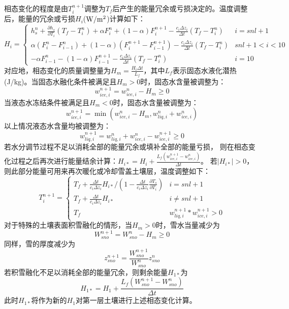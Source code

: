 相态变化的程度是由$T_i^{n+1}$调整为$T_f$后产生的能量冗余或亏损决定的。温度调整后，能量的冗余或亏损$H_i$($\rm W/m^2$)计算如下：
\begin{equation}
H_{i}=\left\{\begin{array}{lr}h_{s}^{n}+\frac{\partial h_{s}}{\partial T_{i}}\left(T_{f}-T_{i}^{n}\right)+\alpha F_{i}^{n}+(1-\alpha) F_{i}^{n+1}-\frac{c_{i} \Delta z_{i}}{\Delta t}\left(T_{f}-T_{i}^{n}\right) & i=s n l+1 \\ \alpha\left(F_{i}^{n}-F_{i-1}^{n}\right)+(1-\alpha)\left(F_{i}^{n+1}-F_{i-1}^{n+1}\right)-\frac{c_{i} \Delta z_{i}}{\Delta t}\left(T_{f}-T_{i}^{n}\right) & s n l+1<i<10 \\ -\alpha F_{i-1}^{n}-(1-\alpha) F_{i-1}^{n+1}-\frac{c_{i} \Delta z_{i}}{\Delta t}\left(T_{f}-T_{i}^{n}\right) & i=10\end{array}\right.
\end{equation}
对应地，相态变化的质量调整量为$H_{m}=\frac{H_{i} \Delta t}{L_{f}}$，其中$L_f$表示固态水液化潜热(J/kg)。当固态水融化条件被满足且$H_m>0$时，固态水含量被调整为：
\begin{equation}
w_{ice, i}^{n+1}=w_{ice, i}^{n}-H_{m} \geq 0
\end{equation}
当液态水冻结条件被满足且$H_m<0$时，固态水含量被调整为：
\begin{equation}
w_{ice, i}^{n+1}=\min \left(w_{ice, i}^{n}-H_{m}, w_{liq, i}^{n}+w_{ice, i}^{n}\right)
\end{equation}
以上情况液态水含量均被调整为：
\begin{equation}
w_{liq, i}^{n+1}=w_{liq, i}^{n}+w_{ice, i}^{n}-w_{ice, i}^{n+1} \geq 0
\end{equation}
若水分调节过程不足以消耗全部的能量冗余或填补全部的能量亏损，
则在相态变化过程之后再次进行能量结余计算：$ H_{i *}=H_{i}+\frac{L_{f}\left(w_{ice, i}^{n+1}-w_{ice, i}^{n}\right)}{\Delta t}$。
若$\left|H_{i\ast}\right|>0$，则此部分能量可用来再次暖化或冷却雪盖土壤层，温度调整如下：
\begin{equation}
T_{i}^{n+1}=\left\{\begin{array}{lr}T_{f}+\frac{\Delta t}{c_{i} \Delta z_{i}} H_{i *} /\left(1-\frac{\Delta t}{c_{i} \Delta z_{i}} \frac{\partial T_{s}}{\partial T_{i}}\right) & i=s n l+1 \\ T_{f}+\frac{\Delta t}{c_{i} \Delta z_{i}} H_{i *} & i \neq s n l+1 \\ T_{f} & w_{liq, i}^{n+1} * w_{ice, i}^{n+1}>0\end{array}\right.
\end{equation}
对于特殊的土壤表面积雪融化的情形，当$H_m>0$时，雪水当量减少为
\begin{equation}
W_{sno}^{n+1}=W_{s no}^{n}-H_{m} \geq 0
\end{equation}
同样，雪的厚度减少为
\begin{equation}
z_{sno}^{n+1}=\frac{W_{sno}^{n+1}}{W_{sno}^{n}} z_{sno}^{n}
\end{equation}
若积雪融化不足以消耗全部的能量冗余，则剩余能量$H_{1\ast}$为
\begin{equation}
H_{1 *}=H_{1}+\frac{L_{f}\left(W_{sno}^{n+1}-W_{sno}^{n}\right)}{\Delta t}
\end{equation}
此时$H_{1\ast}$将作为新的$H_1$对第一层土壤进行上述相态变化计算。


